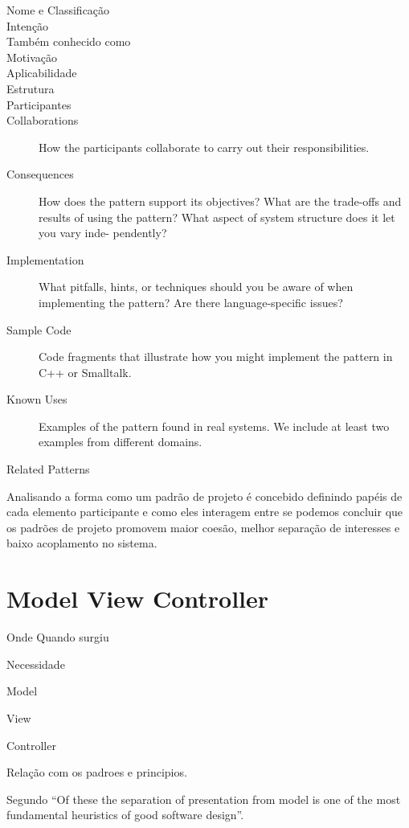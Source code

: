 \begin{description}
\item[Nome e Classificação]
\item[Intenção]
\item[Também conhecido como]
\item[Motivação]
\item[Aplicabilidade]
\item[Estrutura]
\item[Participantes]
\item[Collaborations]
How the participants collaborate to carry out their responsibilities.
\item[Consequences]
How does the pattern support its objectives? What are the trade-offs and results
of using the pattern? What aspect of system structure does it let you vary inde-
pendently?
\item[Implementation]
What pitfalls, hints, or techniques should you be aware of when implementing
the pattern? Are there language-specific issues?
\item[Sample Code]
Code fragments that illustrate how you might implement the pattern in C++ or
Smalltalk.
\item[Known Uses]
Examples of the pattern found in real systems. We include at least two examples
from different domains.
\item[Related Patterns]
\end{description}

Analisando a forma como um padrão de projeto é concebido definindo papéis de
cada elemento participante e como eles interagem entre se podemos concluir que
os padrões de projeto promovem maior coesão, melhor separação de interesses e
baixo acoplamento no sistema.


\section*{Model View Controller}

Onde Quando surgiu

Necessidade

Model
 
View

Controller

Relação com os padroes e principios.


Segundo  ``Of these the separation of presentation
from model is one of the most fundamental heuristics of good software design''.

